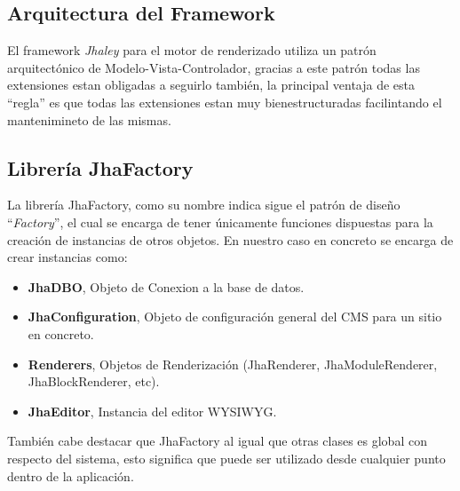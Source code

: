 \subsection{Arquitectura del Framework}
El framework \textit{Jhaley} para el motor de renderizado utiliza un patr\'on arquitect\'onico de Modelo-Vista-Controlador, gracias a este patr\'on todas las extensiones estan obligadas a seguirlo tambi\'en, la principal ventaja de esta ``regla'' es que todas las extensiones estan muy bienestructuradas facilintando el mantenimineto de las mismas.\\

\subsection{Librer\'ia JhaFactory}
La librer\'ia JhaFactory, como su nombre indica sigue el patr\'on de dise\~no ``\textit{Factory}'', el cual se encarga de tener \'unicamente funciones dispuestas para la creaci\'on de instancias de otros objetos. En nuestro caso en concreto se encarga de crear instancias como:
\begin{itemize}
\item \textbf{JhaDBO}, Objeto de Conexion a la base de datos.
\item \textbf{JhaConfiguration}, Objeto de configuraci\'on general del CMS para un sitio en concreto.
\item \textbf{Renderers}, Objetos de Renderizaci\'on (\textsf{JhaRenderer}, \textsf{JhaModuleRenderer}, \textsf{JhaBlockRenderer}, etc).
\item \textbf{JhaEditor}, Instancia del editor WYSIWYG.
\end{itemize}
Tambi\'en cabe destacar que JhaFactory al igual que otras clases es global con respecto del sistema, esto significa que puede ser utilizado desde cualquier punto dentro de la aplicaci\'on.

